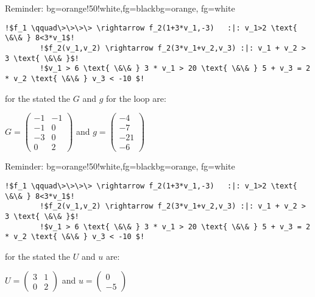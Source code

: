 \begin{frame}[fragile]
	\begin{variableblock}{Reminder: \its}{bg=orange!50!white,fg=black}{bg=orange, fg=white}
		\begin{lstlisting}[linewidth=10.5cm, escapechar = !]
		!$f_1 \qquad\>\>\>\> \rightarrow f_2(1+3*v_1,-3)   :|: v_1>2 \text{ \&\& } 8<3*v_1$!
		!$f_2(v_1,v_2) \rightarrow f_2(3*v_1+v_2,v_3) :|: v_1 + v_2 > 3 \text{ \&\& }$! 
		!$v_1 > 6 \text{ \&\& } 3 * v_1 > 20 \text{ \&\& } 5 + v_3 = 2 * v_2 \text{ \&\& } v_3 < -10 $!
		\end{lstlisting}
	\end{variableblock}
	\begin{example}[\guardmatrix, \guardconstants]
		for the stated \its the \guardconstants $G$ and \guardconstants $g$ for the loop are:\newline
		\begin{center}
			\vspace{-2em}
			$G = \begin{pmatrix} -1 & -1 \\ -1 & 0 \\ -3 & 0 \\ 0 & 2 \end{pmatrix}$ and $g= \begin{pmatrix} -4 \\ -7 \\ -21 \\ -6 \end{pmatrix}$
		\end{center}		
	\end{example}
\end{frame}

\begin{frame}[fragile]
	\begin{variableblock}{Reminder: \its}{bg=orange!50!white,fg=black}{bg=orange, fg=white}
		\begin{lstlisting}[linewidth=10.5cm, escapechar = !]
		!$f_1 \qquad\>\>\>\> \rightarrow f_2(1+3*v_1,-3)   :|: v_1>2 \text{ \&\& } 8<3*v_1$!
		!$f_2(v_1,v_2) \rightarrow f_2(3*v_1+v_2,v_3) :|: v_1 + v_2 > 3 \text{ \&\& }$! 
		!$v_1 > 6 \text{ \&\& } 3 * v_1 > 20 \text{ \&\& } 5 + v_3 = 2 * v_2 \text{ \&\& } v_3 < -10 $!
		\end{lstlisting}
	\end{variableblock}
		\begin{example}[\updatematrix, \updateconstants]
			for the stated \its the \updatematrix $U$ and \updateconstants $u$ are:\newline
			\begin{center}
				\vspace{-2em}
				$U = \begin{pmatrix} 3 & 1 \\ 0 & 2 \end{pmatrix}$ and $u = \begin{pmatrix} 0 \\ -5 \end{pmatrix}$
			\end{center}		
		\end{example}
\end{frame}

